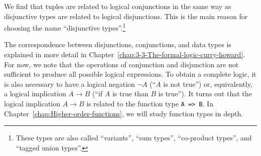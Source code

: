 We find that tuples are related to logical conjunctions in the same
way as disjunctive types are related to logical disjunctions. This
is the main reason for choosing the name ``disjunctive types''.\footnote{These types are also called ``variants'', ``sum types'', ``co-product
types'', and ``tagged union types''.}

The correspondence between disjunctions, conjunctions, and data types
is explained in more detail in Chapter~\ref{chap:3-3-The-formal-logic-curry-howard}.
For now, we note that the operations of conjunction and disjunction
are not sufficient to produce all possible logical expressions. To
obtain a complete logic, it is also necessary to have a logical negation
$\neg A$ (``$A$ is not true'') or, equivalently, a logical implication
$A\rightarrow B$ (``if $A$ is true than $B$ is true''). It turns
out that the logical implication $A\rightarrow B$ is related to the
function type \lstinline!A => B!. In Chapter~\ref{chap:Higher-order-functions},
we will study function types in depth.
